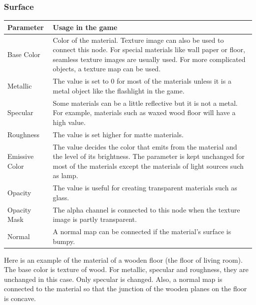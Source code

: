 \documentclass{article}
\begin{document}
\subsubsection{Surface}
 \begin{tabular}{ | p{2cm} | p{12cm} | }
 \hline
 \textbf{Parameter} & \textbf{Usage in the game} \\ 
 \hline
 Base Color & Color of the material. Texture image can also be used to connect this node. For special materials like wall paper or floor, seamless texture images are usually used. For more complicated objects, a texture map can be used. \\ 
 \hline
 Metallic & The value is set to 0 for most of the materials unless it is a metal object like the flashlight in the game. \\
 \hline
 Specular & Some materials can be a little reflective but it is not a metal. For example, materials such as waxed wood floor will have a high value. \\
 \hline
 Roughness & The value is set higher for matte materials. \\
 \hline
 Emissive Color & The value decides the color that emits from the material and the level of its brightness. The parameter is kept unchanged for most of the materials except the materials of light sources such as lamp. \\
 \hline
 Opacity & The value is useful for creating transparent materials such as glass. \\
 \hline
 Opacity Mask & The alpha channel is connected to this node when the texture image is partly transparent. \\
 \hline
 Normal & A normal map can be connected if the material’s surface is bumpy. \\
 \hline
\end{tabular}
\bigskip

Here is an example of the material of a wooden floor (the floor of living room). The base color is texture of wood. For metallic, specular and roughness, they are unchanged in this case. Only specular is changed. Also, a normal map is connected to the material so that the junction of the wooden planes on the floor is concave.\\
\end{document}
